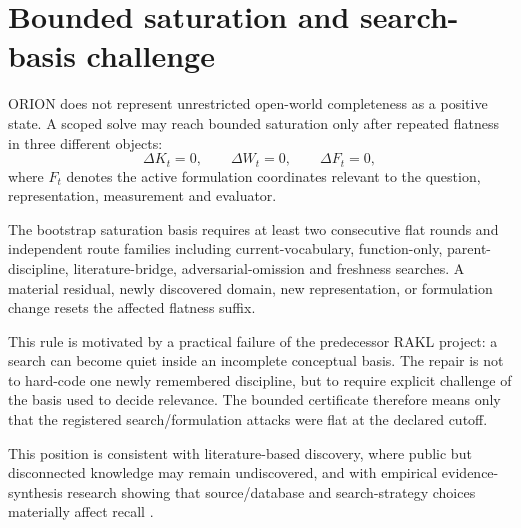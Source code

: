 \section{Bounded saturation and search-basis challenge}

ORION does not represent unrestricted open-world completeness as a positive state. A scoped solve may reach bounded saturation only after repeated flatness in three different objects:
\[
\Delta K_t=0,\qquad \Delta W_t=0,\qquad \Delta F_t=0,
\]
where $F_t$ denotes the active formulation coordinates relevant to the question, representation, measurement and evaluator.

The bootstrap saturation basis requires at least two consecutive flat rounds and independent route families including current-vocabulary, function-only, parent-discipline, literature-bridge, adversarial-omission and freshness searches. A material residual, newly discovered domain, new representation, or formulation change resets the affected flatness suffix.

This rule is motivated by a practical failure of the predecessor RAKL project: a search can become quiet inside an incomplete conceptual basis. The repair is not to hard-code one newly remembered discipline, but to require explicit challenge of the basis used to decide relevance. The bounded certificate therefore means only that the registered search/formulation attacks were flat at the declared cutoff.

This position is consistent with literature-based discovery, where public but disconnected knowledge may remain undiscovered, and with empirical evidence-synthesis research showing that source/database and search-strategy choices materially affect recall \cite{swanson1986,kastner2009}.
